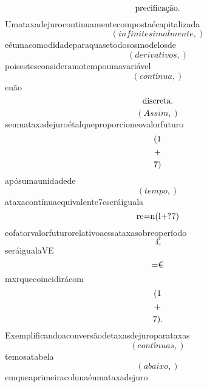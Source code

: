 \documentclass{article}
\begin{document}
\begin{equation}
$precificação.$
\end{equation}Umataxadejurocontinuamentecompostaécapitalizada\begin{equation}
\left( infinitesimalmente,\right)
\end{equation}eéumacomodidadeparaquasetodososmodelosde\begin{equation}
\left( derivativos,\right)
\end{equation}poisestesconsideramotempoumavariável\begin{equation}
\left( contínua,\right)
\end{equation}enão\begin{equation}
$discreta.$
\end{equation}\begin{equation}
\left( Assim,\right)
\end{equation}seumataxadejuroétalqueproporcioneovalorfuturo\begin{equation}
$(1$
\end{equation}\begin{equation}
$+$
\end{equation}\begin{equation}
$7)$
\end{equation}apósumaunidadede\begin{equation}
\left( tempo,\right)
\end{equation}ataxacontínuaequivalente7cseráiguala\begin{equation}
$re=n(l+?7)$
\end{equation}eofatorvalorfuturorelativoaessataxasobreoperíodo\begin{equation}
£
\end{equation}seráigualaVE\begin{equation}
$=€$
\end{equation}mxrquecoincidirácom\begin{equation}
$(1$
\end{equation}\begin{equation}
$+$
\end{equation}\begin{equation}
$7).$
\end{equation}Exemplificandoaconversãodetaxasdejuroparataxas\begin{equation}
\left( contínuas,\right)
\end{equation}temosatabela\begin{equation}
\left( abaixo,\right)
\end{equation}emqueaprimeiracolunaéumataxadejuro\begin{equation}

\end{equation}
\end{document}

